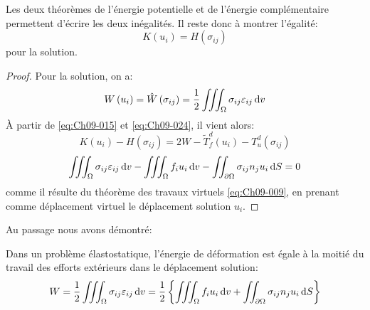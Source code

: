 Les deux théorèmes de l'énergie potentielle et de l'énergie complémentaire permettent d'écrire les deux inégalités.
Il reste donc à montrer l'égalité: 
\begin{equation}
    K\left( u_i \right) = H\left( \sigma_{ij} \right)
    \label{eq:Ch09-030}
\end{equation}
pour la solution. 
\begin{proof}
    Pour la solution, on a:
    \begin{displaymath}
        W\left( u_i \right) = \hat{W} \left( \sigma_{ij} \right) = \frac{1}{2} \iiint_{\Omega} \sigma_{ij} \varepsilon_{ij} \mathop{\mathrm{{}d}}\mathopen{} v
    \end{displaymath}
    À partir de \eqref{eq:Ch09-015} et \eqref{eq:Ch09-024}, il vient alors:
    \begin{displaymath}
        K\left( u_i \right) - H \left( \sigma_{ij} \right) = 2W - \tilde{T}_f^d \left( u_i \right) - T_u^d \left( \sigma_{ij} \right)
    \end{displaymath}
    \begin{displaymath}
        \iiint_{\Omega} \sigma_{ij} \varepsilon_{ij} \mathop{\mathrm{{}d}}\mathopen{} v - \iiint_{\Omega} f_i u_i \mathop{\mathrm{{}d}}\mathopen{} v - \iint_{\partial \Omega} \sigma_{ij} n_j u_i \mathop{\mathrm{{}d}}\mathopen{} S = 0
    \end{displaymath}
    comme il résulte du théorème des travaux virtuels \eqref{eq:Ch09-009}, en prenant comme déplacement virtuel le déplacement solution $u_i$.
\end{proof}

Au passage nous avons démontré:
\begin{thm}
    Dans un problème élastostatique, l'énergie de déformation est égale à la moitié du travail des efforts extérieurs dans le déplacement solution:
    \begin{equation}
        W = \frac{1}{2} \iiint_{\Omega} \sigma_{ij} \varepsilon_{ij} \mathop{\mathrm{{}d}}\mathopen{} v = \frac{1}{2} \left\{ \iiint_{\Omega} f_i u_i \mathop{\mathrm{{}d}}\mathopen{} v + \iint_{\partial \Omega} \sigma_{ij} n_j u_i \mathop{\mathrm{{}d}}\mathopen{} S \right\}
        \label{eq:Ch09-031}
    \end{equation}
\end{thm}


